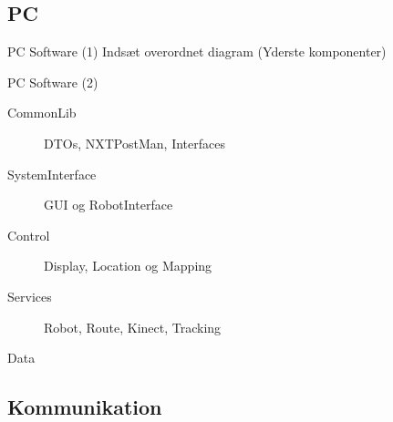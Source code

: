 \subsection{PC}

\begin{frame}{PC Software (1)}
Indsæt overordnet diagram (Yderste komponenter)
\end{frame}

\begin{frame}{PC Software (2)}
\begin{description}
\item[CommonLib]{DTOs, NXTPostMan, Interfaces}
\item[SystemInterface]{GUI og RobotInterface}
\item[Control]{Display, Location og Mapping}
\item[Services]{Robot, Route, Kinect, Tracking}
\item[Data]
\end{description}
\end{frame}

\subsection{Kommunikation}

